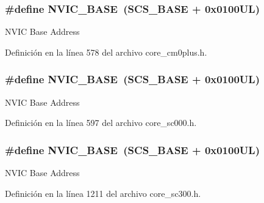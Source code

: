 \subsubsection[{\texorpdfstring{N\+V\+I\+C\+\_\+\+B\+A\+SE}{NVIC_BASE}}]{\setlength{\rightskip}{0pt plus 5cm}\#define N\+V\+I\+C\+\_\+\+B\+A\+SE~({\bf S\+C\+S\+\_\+\+B\+A\+SE} +  0x0100\+U\+L)}\hypertarget{group___c_m_s_i_s__core__base_gaa0288691785a5f868238e0468b39523d}{}\label{group___c_m_s_i_s__core__base_gaa0288691785a5f868238e0468b39523d}
N\+V\+IC Base Address 

Definición en la línea 578 del archivo core\+\_\+cm0plus.\+h.

\subsubsection[{\texorpdfstring{N\+V\+I\+C\+\_\+\+B\+A\+SE}{NVIC_BASE}}]{\setlength{\rightskip}{0pt plus 5cm}\#define N\+V\+I\+C\+\_\+\+B\+A\+SE~({\bf S\+C\+S\+\_\+\+B\+A\+SE} +  0x0100\+U\+L)}\hypertarget{group___c_m_s_i_s__core__base_gaa0288691785a5f868238e0468b39523d}{}\label{group___c_m_s_i_s__core__base_gaa0288691785a5f868238e0468b39523d}
N\+V\+IC Base Address 

Definición en la línea 597 del archivo core\+\_\+sc000.\+h.

\subsubsection[{\texorpdfstring{N\+V\+I\+C\+\_\+\+B\+A\+SE}{NVIC_BASE}}]{\setlength{\rightskip}{0pt plus 5cm}\#define N\+V\+I\+C\+\_\+\+B\+A\+SE~({\bf S\+C\+S\+\_\+\+B\+A\+SE} +  0x0100\+U\+L)}\hypertarget{group___c_m_s_i_s__core__base_gaa0288691785a5f868238e0468b39523d}{}\label{group___c_m_s_i_s__core__base_gaa0288691785a5f868238e0468b39523d}
N\+V\+IC Base Address 

Definición en la línea 1211 del archivo core\+\_\+sc300.\+h.

